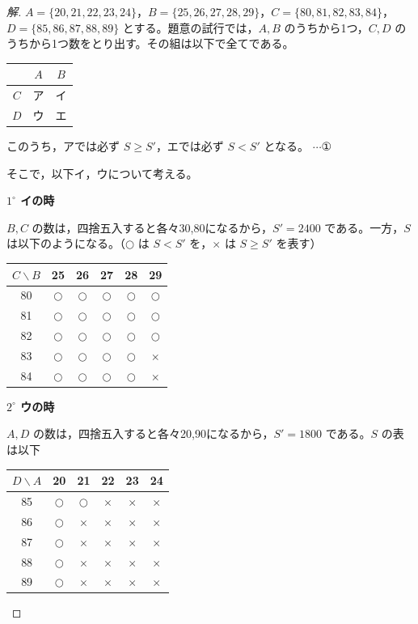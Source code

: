 \documentclass[../main.tex]{subfiles}
\begin{document}
\begin{proof}[解]
  $A=\{20,21,22,23,24\}$，$B=\{25,26,27,28,29\}$，$C=\{80,81,82,83,84\}$，
  $D=\{85,86,87,88,89\}$ とする。題意の試行では，$A,B$ のうちから1つ，$C,D$ のうちから1つ数をとり出す。その組は以下で全てである。

  \begin{center}
    \begin{tabular}{c|c|c}
      & $A$ & $B$ \\
      \hline
      $C$ & ア & イ \\
      \hline
      $D$ & ウ & エ
    \end{tabular}
  \end{center}

  このうち，アでは必ず $S\ge S'$，エでは必ず $S<S'$ となる。 $\cdots$①

  そこで，以下イ，ウについて考える。

  \textbf{$1^\circ$ イの時}

  $B,C$ の数は，四捨五入すると各々30,80になるから，$S'=2400$ である。一方，$S$ は以下のようになる。（$\bigcirc$ は $S<S'$ を，$\times$ は $S\ge S'$ を表す）

  \begin{center}
    \begin{tabular}{c|c|c|c|c|c}
      $C\backslash B$ & 25 & 26 & 27 & 28 & 29 \\
      \hline
      80 & $\bigcirc$ & $\bigcirc$ & $\bigcirc$ & $\bigcirc$ & $\bigcirc$ \\
      \hline
      81 & $\bigcirc$ & $\bigcirc$ & $\bigcirc$ & $\bigcirc$ & $\bigcirc$ \\
      \hline
      82 & $\bigcirc$ & $\bigcirc$ & $\bigcirc$ & $\bigcirc$ & $\bigcirc$ \\
      \hline
      83 & $\bigcirc$ & $\bigcirc$ & $\bigcirc$ & $\bigcirc$ & $\times$ \\
      \hline
      84 & $\bigcirc$ & $\bigcirc$ & $\bigcirc$ & $\bigcirc$ & $\times$
    \end{tabular}
  \end{center}

  \textbf{$2^\circ$ ウの時}

  $A,D$ の数は，四捨五入すると各々20,90になるから，$S'=1800$ である。$S$ の表は以下

  \begin{center}
    \begin{tabular}{c|c|c|c|c|c}
      $D\backslash A$ & 20 & 21 & 22 & 23 & 24 \\
      \hline
      85 & $\bigcirc$ & $\bigcirc$ & $\times$ & $\times$ & $\times$ \\
      \hline
      86 & $\bigcirc$ & $\times$ & $\times$ & $\times$ & $\times$ \\
      \hline
      87 & $\bigcirc$ & $\times$ & $\times$ & $\times$ & $\times$ \\
      \hline
      88 & $\bigcirc$ & $\times$ & $\times$ & $\times$ & $\times$ \\
      \hline
      89 & $\bigcirc$ & $\times$ & $\times$ & $\times$ & $\times$
    \end{tabular}
  \end{center}


\end{proof}
\end{document}
